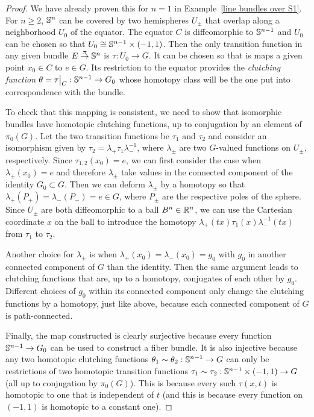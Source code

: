\begin{proof}
    We have already proven this for $n=1$ in Example~\ref{line bundles over S1}. For $n\geq 2$, $\mathbb{S}^n$ can be covered by two hemispheres $U_\pm$ that overlap along a neighborhood $U_0$ of the equator. The equator $C$ is diffeomorphic to $\mathbb{S}^{n-1}$ and $U_0$ can be chosen so that $U_0\cong \mathbb{S}^{n-1}\times (-1,1)$. Then the only transition function in any given bundle $E\overset{\pi}{\to}\mathbb{S}^n$ is $\tau:U_0\to G$. It can be chosen so that is maps a given point $x_0\in C$ to $e\in G$. Its restriction to the equator provides the \emph{clutching function} $\theta=\restr{\tau}{C}:\bbS^{n-1}\to G_0$ whose homotopy class will be the one put into correspondence with the bundle. 
     
    To check that this mapping is consistent, we need to show that isomorphic bundles have homotopic clutching functions, up to conjugation by an element of $\pi_0(G)$. Let the two transition functions be $\tau_1$ and $\tau_2$ and consider an isomorphism given by $\tau_2=\lambda_+ \tau_1 \lambda_-^{-1}$, where $\lambda_\pm$ are two $G$-valued functions on $U_\pm$, respectively. Since $\tau_{1,2}(x_0)=e$, we can first consider the case when $\lambda_\pm(x_0)=e$ and therefore $\lambda_\pm$ take values in the connected component of the identity $G_0\subset G$. Then we can deform $\lambda_\pm$ by a homotopy so that $\lambda_+(P_+)=\lambda_-(P_-)=e\in G$, where $P_\pm$ are the respective poles of the sphere. Since $U_\pm $ are both diffeomorphic to a ball $B^n\in\mathbb{R}^n$, we can use the Cartesian coordinate $x$ on the ball to introduce the homotopy $\lambda_+(tx)\tau_1(x) \lambda_-^{-1}(tx)$ from $\tau_1$ to $\tau_2$. 
    
    Another choice for $\lambda_\pm$ is when $\lambda_+(x_0)=\lambda_-(x_0)=g_0$ with $g_0$ in another connected component of $G$ than the identity. Then the same argument leads to clutching functions that are, up to a homotopy, conjugates of each other by $g_0$. Different choices of $g_0$ within its connected component only change the clutching functions by a homotopy, just like above, because each connected component of $G$ is path-connected.
    
    Finally, the map constructed is clearly surjective because every function $\mathbb{S}^{n-1}\to G_0$ can be used to construct a fiber bundle. It is also injective because any two homotopic clutching functions $\theta_1\sim\theta_2:\mathbb{S}^{n-1}\to G$ can only be restrictions of two homotopic transition functions $\tau_1\sim\tau_2:\mathbb{S}^{n-1}\times(-1,1)\to G$ (all up to conjugation by $\pi_0(G)$). This is because every such $\tau(x,t)$ is homotopic to one that is independent of $t$ (and this is because every function on $(-1,1)$ is homotopic to a constant one).
\end{proof}


